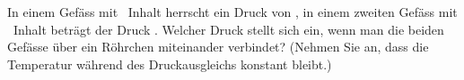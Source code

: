 In einem Gefäss mit \VEiO\ Inhalt herrscht ein Druck von \pEiO, in einem zweiten Gefäss mit \VZwO\ Inhalt beträgt der Druck \pZwO. Welcher Druck stellt sich ein, wenn man die beiden Gefässe über ein Röhrchen miteinander verbindet? (Nehmen Sie an, dass die Temperatur während des Druckausgleichs konstant bleibt.)
